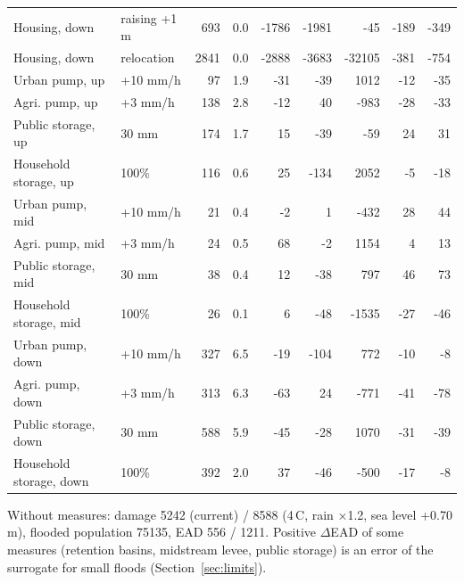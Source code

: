 \begin{table}[tbp]
\begin{tabular}{@{}llrrrrrrr@{}}
Housing, down & raising +1 m & 693 & 0.0 & -1786 & -1981 & -45 & -189 & -349 \\
Housing, down & relocation & 2841 & 0.0 & -2888 & -3683 & -32105 & -381 & -754 \\
Urban pump, up & +10 mm/h & 97 & 1.9 & -31 & -39 & 1012 & -12 & -35 \\
Agri. pump, up & +3 mm/h & 138 & 2.8 & -12 & 40 & -983 & -28 & -33 \\
Public storage, up & 30 mm & 174 & 1.7 & 15 & -39 & -59 & 24 & 31 \\
Household storage, up & 100\% & 116 & 0.6 & 25 & -134 & 2052 & -5 & -18 \\
Urban pump, mid & +10 mm/h & 21 & 0.4 & -2 & 1 & -432 & 28 & 44 \\
Agri. pump, mid & +3 mm/h & 24 & 0.5 & 68 & -2 & 1154 & 4 & 13 \\
Public storage, mid & 30 mm & 38 & 0.4 & 12 & -38 & 797 & 46 & 73 \\
Household storage, mid & 100\% & 26 & 0.1 & 6 & -48 & -1535 & -27 & -46 \\
Urban pump, down & +10 mm/h & 327 & 6.5 & -19 & -104 & 772 & -10 & -8 \\
Agri. pump, down & +3 mm/h & 313 & 6.3 & -63 & 24 & -771 & -41 & -78 \\
Public storage, down & 30 mm & 588 & 5.9 & -45 & -28 & 1070 & -31 & -39 \\
Household storage, down & 100\% & 392 & 2.0 & 37 & -46 & -500 & -17 & -8 \\
\bottomrule
\end{tabular}
\par\footnotesize\raggedright Without measures: damage 5242 (current) / 8588 (4\,\textdegree C, rain ×1.2, sea level +0.70 m), flooded population 75135, EAD 556 / 1211. Positive $\Delta$EAD of some measures (retention basins, midstream levee, public storage) is an error of the surrogate for small floods (Section~\ref{sec:limits}).
\end{table}
